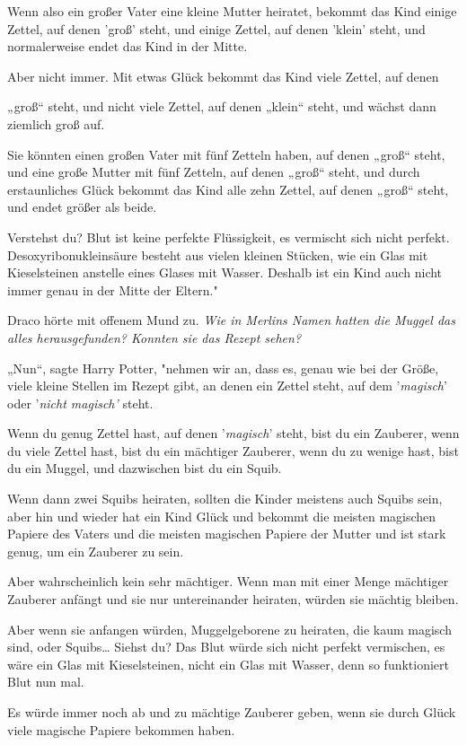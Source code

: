 {Wenn also ein großer Vater eine kleine Mutter heiratet, bekommt das Kind einige Zettel, auf denen 'groß' steht, und einige Zettel, auf denen 'klein' steht, und normalerweise endet das Kind in der Mitte.

Aber nicht immer. Mit etwas Glück bekommt das Kind viele Zettel, auf denen

„groß“ steht, und nicht viele Zettel, auf denen „klein“ steht, und wächst dann ziemlich groß auf.

Sie könnten einen großen Vater mit fünf Zetteln haben, auf denen „groß“ steht, und eine große Mutter mit fünf Zetteln, auf denen „groß“ steht, und durch erstaunliches Glück bekommt das Kind alle zehn Zettel, auf denen „groß“ steht, und endet größer als beide.

Verstehst du? Blut ist keine perfekte Flüssigkeit, es vermischt sich nicht perfekt. Desoxyribonukleinsäure besteht aus vielen kleinen Stücken, wie ein Glas mit Kieselsteinen anstelle eines Glases mit Wasser. Deshalb ist ein Kind auch nicht immer genau in der Mitte der Eltern."

Draco hörte mit offenem Mund zu. \emph{Wie in Merlins Namen hatten die Muggel das alles herausgefunden? Konnten sie das Rezept sehen?}

„Nun“, sagte Harry Potter, "nehmen wir an, dass es, genau wie bei der Größe, viele kleine Stellen im Rezept gibt, an denen ein Zettel steht, auf dem '\emph{magisch}' oder '\emph{nicht magisch'} steht.

Wenn du genug Zettel hast, auf denen '\emph{magisch}' steht, bist du ein Zauberer, wenn du viele Zettel hast, bist du ein mächtiger Zauberer, wenn du zu wenige hast, bist du ein Muggel, und dazwischen bist du ein Squib.

Wenn dann zwei Squibs heiraten, sollten die Kinder meistens auch Squibs sein, aber hin und wieder hat ein Kind Glück und bekommt die meisten magischen Papiere des Vaters und die meisten magischen Papiere der Mutter und ist stark genug, um ein Zauberer zu sein.

Aber wahrscheinlich kein sehr mächtiger. Wenn man mit einer Menge mächtiger Zauberer anfängt und sie nur untereinander heiraten, würden sie mächtig bleiben.

Aber wenn sie anfangen würden, Muggelgeborene zu heiraten, die kaum magisch sind, oder Squibs… Siehst du? Das Blut würde sich nicht perfekt vermischen, es wäre ein Glas mit Kieselsteinen, nicht ein Glas mit Wasser, denn so funktioniert Blut nun mal.

Es würde immer noch ab und zu mächtige Zauberer geben, wenn sie durch Glück viele magische Papiere bekommen haben.

}

